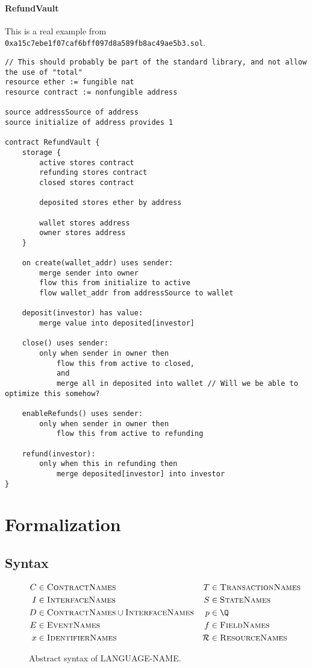 \documentclass[10pt]{article}
\newcommand{\langName}{LANGUAGE-NAME\xspace}
\begin{document}
\paragraph{RefundVault}
This is a real example from \lstinline{0xa15c7ebe1f07caf6bff097d8a589fb8ac49ae5b3.sol}.

\begin{lstlisting}
// This should probably be part of the standard library, and not allow the use of "total"
resource ether := fungible nat
resource contract := nonfungible address

source addressSource of address
source initialize of address provides 1

contract RefundVault {
    storage {
        active stores contract
        refunding stores contract
        closed stores contract

        deposited stores ether by address

        wallet stores address
        owner stores address
    }

    on create(wallet_addr) uses sender:
        merge sender into owner
        flow this from initialize to active
        flow wallet_addr from addressSource to wallet

    deposit(investor) has value:
        merge value into deposited[investor]

    close() uses sender:
        only when sender in owner then
            flow this from active to closed,
            and
            merge all in deposited into wallet // Will we be able to optimize this somehow?

    enableRefunds() uses sender:
        only when sender in owner then
            flow this from active to refunding

    refund(investor):
        only when this in refunding then
            merge deposited[investor] into investor
}
\end{lstlisting}

\section{Formalization}

\subsection{Syntax}
\begin{figure}[ht]
\begin{align*}
    C &\in \textsc{ContractNames} & T &\in \textsc{TransactionNames} \\
    I &\in \textsc{InterfaceNames} & S &\in \textsc{StateNames}\\
    D &\in \textsc{ContractNames} \cup \textsc{InterfaceNames} & p &\in \Q \\
    E &\in \textsc{EventNames} & f &\in \textsc{FieldNames} \\
    x &\in \textsc{IdentifierNames} & \mathcal{R} &\in \textsc{ResourceNames} \\
\end{align*}
\caption{Abstract syntax of \langName.}
\label{lang-syntax}
\end{figure}
\end{document}
